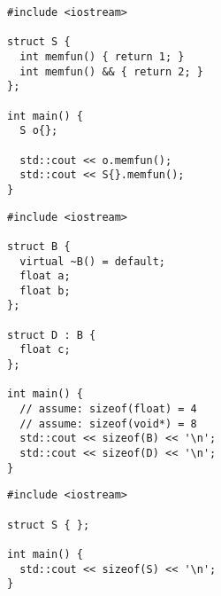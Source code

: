 \begin{frame}[fragile]
  \begin{lstlisting}[language={[11]C++}]
#include <iostream>

struct S {
  int memfun() { return 1; }
  int memfun() && { return 2; }
};

int main() {
  S o{};

  std::cout << o.memfun();
  std::cout << S{}.memfun();
}
  \end{lstlisting}
\end{frame}
\begin{frame}[fragile]
  \begin{lstlisting}
#include <iostream>

struct B {
  virtual ~B() = default;
  float a;
  float b;
};

struct D : B {
  float c;
};

int main() {
  // assume: sizeof(float) = 4
  // assume: sizeof(void*) = 8
  std::cout << sizeof(B) << '\n';
  std::cout << sizeof(D) << '\n';
}
  \end{lstlisting}
\end{frame}
\begin{frame}[fragile]
  \begin{lstlisting}
#include <iostream>

struct S { };

int main() {
  std::cout << sizeof(S) << '\n';
}
  \end{lstlisting}
\end{frame}
